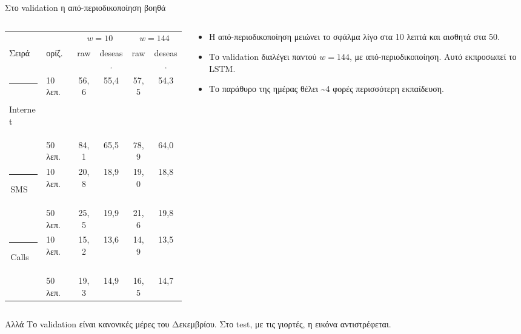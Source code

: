 \documentclass[aspectratio=169,10pt]{beamer}
\newcommand{\muted}[1]{\textcolor{muted}{#1}}
\newcommand{\figcap}[1]{\par\vspace{2pt}{\scriptsize\muted{#1}}}
\newcommand{\ser}[2]{\textcolor{#1}{\rule[0.05em]{0.6em}{0.6em}}\,#2}
\newcommand{\sInet}{\ser{inet}{Internet}}
\newcommand{\sSms}{\ser{sms}{SMS}}
\newcommand{\sCalls}{\ser{calls}{Calls}}
\begin{document}
\begin{frame}{Στο validation η από-περιοδικοποίηση βοηθά}
  \begin{columns}[T, onlytextwidth]
    \begin{column}{0.57\textwidth}
      \footnotesize
      \begin{tabular}{@{}llcccc@{}}
        \toprule
        & & \multicolumn{2}{c}{$w = 10$} & \multicolumn{2}{c}{$w = 144$} \\
        \cmidrule(lr){3-4}\cmidrule(l){5-6}
        Σειρά & ορίζ. & raw & deseas. & raw & deseas. \\
        \midrule
        \sInet   & 10\,λεπ. & 56,6 & 55,4 & 57,5 & \alert{54,3} \\
                 & 50\,λεπ. & 84,1 & 65,5 & 78,9 & \alert{64,0} \\
        \sSms    & 10\,λεπ. & 20,8 & 18,9 & 19,0 & \alert{18,8} \\
                 & 50\,λεπ. & 25,5 & 19,9 & 21,6 & \alert{19,8} \\
        \sCalls  & 10\,λεπ. & 15,2 & 13,6 & 14,9 & \alert{13,5} \\
                 & 50\,λεπ. & 19,3 & 14,9 & 16,5 & \alert{14,7} \\
        \bottomrule
      \end{tabular}
      \figcap{RMSE στο validation (οι τελευταίες ημέρες του train). Έντονα: το καλύτερο ανά γραμμή.}
    \end{column}
    \begin{column}{0.4\textwidth}
      \small
      \begin{itemize}
        \item Η από-περιοδικοποίηση μειώνει το σφάλμα λίγο στα 10 λεπτά και \alert{αισθητά στα 50}.
        \item Το validation διαλέγει παντού \alert{$w = 144$, με από-περιοδικοποίηση}. Αυτό εκπροσωπεί το LSTM.
        \item Το παράθυρο της ημέρας θέλει \textasciitilde 4 φορές περισσότερη εκπαίδευση.
      \end{itemize}
    \end{column}
  \end{columns}
  \vspace{0.4em}
  \begin{block}{Αλλά}
    Το validation είναι κανονικές μέρες του Δεκεμβρίου. Στο test, με τις γιορτές, η εικόνα αντιστρέφεται.
  \end{block}
\end{frame}
\end{document}
